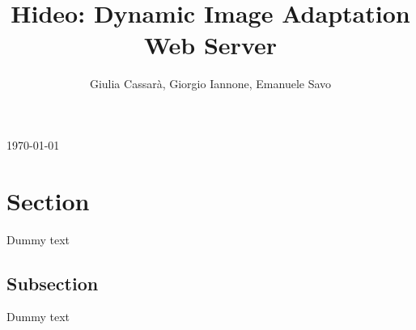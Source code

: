 \documentclass{article}
\title{Hideo: Dynamic Image Adaptation Web Server}
\author{Giulia Cassarà, Giorgio Iannone, Emanuele Savo}
\date{ }
\def\blankpage{%
      \clearpage%
      \thispagestyle{empty}%
      \addtocounter{page}{-1}%
      \null%
      \clearpage}
\begin{document}
\maketitle
\vspace*{1\baselineskip}
\today


\blankpage


\tableofcontents
\newpage

\section{Section}

Dummy text

\subsection{Subsection}

Dummy text
\end{document}

